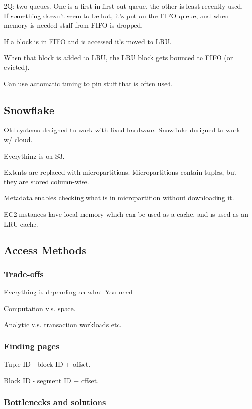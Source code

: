 \documentclass{article}
\begin{document}
			2Q: two queues. One is a first in first out queue, the other is least recently used. If something doesn't seem to be hot, it's put on the FIFO queue, and when memory is needed stuff from FIFO is dropped. 
			
			If a block is in FIFO and is accessed it's moved to LRU.
			
			When that block is added to LRU, the LRU block gets bounced to FIFO (or evicted).
			
			Can use automatic tuning to pin stuff that is often used.
			
		\subsection{Snowflake}
		
			Old systems designed to work with fixed hardware. Snowflake designed to work w/ cloud.
			
			Everything is on S3.
			
			Extents are replaced with micropartitions. Micropartitions contain tuples, but they are stored column-wise.
			
			Metadata enables checking what is in micropartition without downloading it.
			
			EC2 instances have local memory which can be used as a cache, and is used as an LRU cache.
			
		\subsection{Access Methods}
		
			\subsubsection{Trade-offs}
			
				Everything is depending on what You need.
				
				Computation v.s. space.
				
				Analytic v.s. transaction workloads etc.
				
			\subsubsection{Finding pages}
			
				Tuple ID - block ID + offset.
				
				Block ID - segment ID + offset.
				
			\subsubsection{Bottlenecks and solutions}
			
\end{document}
